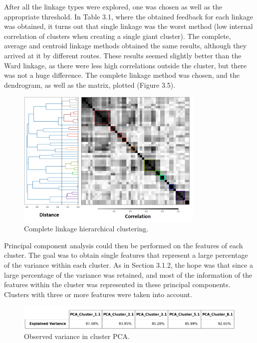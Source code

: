 After all the linkage types were explored, one was chosen as well as the appropriate threshold. In Table 3.1, where the obtained feedback for each linkage was obtained, it turns out that single linkage was the worst method (low internal correlation of clusters when creating a single giant cluster). The complete, average and centroid linkage methods obtained the same results, although they arrived at it by different routes. These results seemed slightly better than the Ward linkage, as there were less high correlations outside the cluster, but there was not a huge difference. 
The complete linkage method was chosen, and the dendrogram, as well as the matrix, plotted (Figure 3.5).\\
\begin{figure}[h!]
    \centering
    \includegraphics[width=0.8\textwidth]{Images/Results/Feature Analysis/h.complete.png}
    \caption{Complete linkage hierarchical clustering.}
\end{figure}

 Principal component analysis could then be performed on the features of each cluster. The goal was to obtain single features that represent a large percentage of the variance within each cluster. As in Section 3.1.2, the hope was that since a large percentage of the variance was retained, and most of the information of the features within the cluster was represented in these principal components. Clusters with three or more features were taken into account.\\
 \begin{figure}[h!]
    \centering
    \includegraphics[width=\textwidth]{Images/Results/Feature Analysis/PCA cluster.png}
    \caption{Observed variance in cluster PCA.}
\end{figure} 


